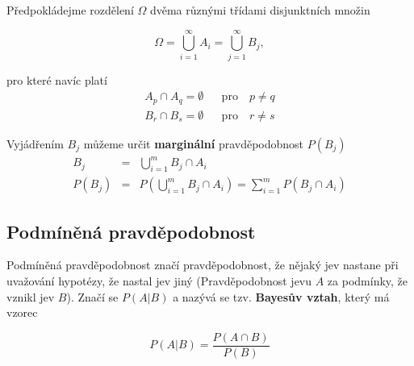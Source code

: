 Předpokládejme rozdělení $\Omega$ dvěma různými třídami disjunktních množin

\[ \Omega = \bigcup_{i=1}^\infty A_i = \bigcup_{j=1}^\infty B_j, \]

pro které navíc platí
\begin{eqnarray*}
A_p\cap A_q = \emptyset && \text{pro}\quad p\neq q\\
B_r\cap B_s = \emptyset && \text{pro}\quad r\neq s
\end{eqnarray*}

\begin{figure}
\end{figure}

Vyjádřením $B_j$ můžeme určit \textbf{marginální} pravděpodobnost $P(B_j)$
\begin{eqnarray*}
B_j & = & \bigcup_{i=1}^m B_j\cap A_i\\
P(B_j) & = & P\left(\bigcup_{i=1}^m B_j\cap A_i\right) = \sum_{i=1}^m P(B_j\cap A_i)
\end{eqnarray*}

\subsection{Podmíněná pravděpodobnost}
Podmíněná pravděpodobnost značí pravděpodobnost, že nějaký jev nastane při uvažování hypotézy, že nastal jev jiný (Pravděpodobnost jevu $A$ za podmínky, že vznikl jev $B$). Značí se $P(A|B)$ a nazývá se tzv. \textbf{Bayesův vztah}, který má vzorec

\[ P(A|B) = \frac{P(A\cap B)}{P(B)} \]

